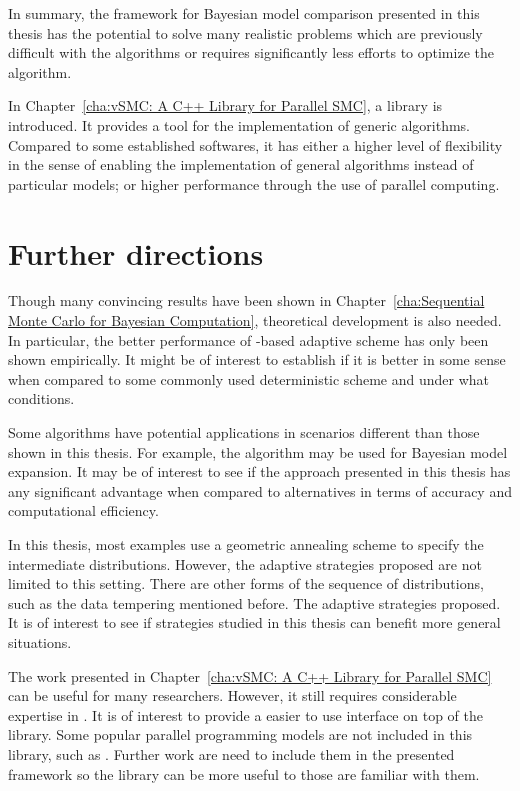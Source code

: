 In summary, the \smc framework for Bayesian model comparison presented in this
thesis has the potential to solve many realistic problems which are previously
difficult with the \mcmc algorithms or requires significantly less efforts to
optimize the algorithm.

In Chapter~\ref{cha:vSMC: A C++ Library for Parallel SMC}, a \cpp library is
introduced. It provides a tool for the implementation of generic \smc
algorithms. Compared to some established softwares, it has either a higher
level of flexibility in the sense of enabling the implementation of general
algorithms instead of particular models; or higher performance through the use
of parallel computing.

\section{Further directions}
\label{sec:Further directions}

Though many convincing results have been shown in Chapter~\ref{cha:Sequential
  Monte Carlo for Bayesian Computation}, theoretical development is also
needed. In particular, the better performance of \cess-based adaptive scheme
has only been shown empirically. It might be of interest to establish if it is
better in some sense when compared to some commonly used deterministic
scheme and under what conditions.

Some algorithms have potential applications in scenarios different than those
shown in this thesis. For example, the \smc[3] algorithm may be used for
Bayesian model expansion. It may be of interest to see if the approach
presented in this thesis has any significant advantage when compared to
alternatives in terms of accuracy and computational efficiency.

In this thesis, most examples use a geometric annealing scheme to specify the
intermediate distributions. However, the adaptive strategies proposed are not
limited to this setting. There are other forms of the sequence of
distributions, such as the data tempering mentioned before. The adaptive
strategies proposed. It is of interest to see if strategies studied in this
thesis can benefit more general situations.

The work presented in Chapter~\ref{cha:vSMC: A C++ Library for Parallel SMC}
can be useful for many researchers. However, it still requires considerable
expertise in \cpp. It is of interest to provide a easier to use interface on
top of the library. Some popular parallel programming models are not included
in this library, such as \cuda \cite{cuda}. Further work are need to include
them in the presented framework so the library can be more useful to those are
familiar with them.
